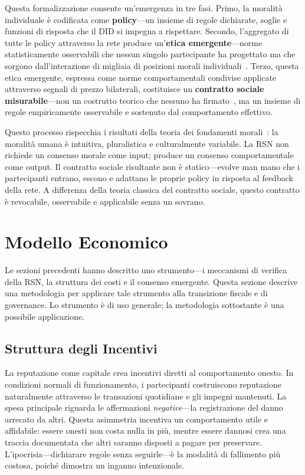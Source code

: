 \documentclass[11pt,a4paper,twocolumn]{article}
\begin{document}
Questa formalizzazione consente un'emergenza in tre fasi. Primo, la moralità individuale è codificata come \textbf{policy}---un insieme di regole dichiarate, soglie e funzioni di risposta che il DID si impegna a rispettare. Secondo, l'aggregato di tutte le policy attraverso la rete produce un'\textbf{etica emergente}---norme statisticamente osservabili che nessun singolo partecipante ha progettato ma che sorgono dall'interazione di migliaia di posizioni morali individuali~\cite{durkheim1893}. Terzo, questa etica emergente, espressa come norme comportamentali condivise applicate attraverso segnali di prezzo bilaterali, costituisce un \textbf{contratto sociale misurabile}---non un costrutto teorico che nessuno ha firmato~\cite{rawls1971}, ma un insieme di regole empiricamente osservabile e sostenuto dal comportamento effettivo.

Questo processo rispecchia i risultati della teoria dei fondamenti morali~\cite{haidt2012}: la moralità umana è intuitiva, pluralistica e culturalmente variabile. La RSN non richiede un consenso morale come input; produce un consenso comportamentale come output. Il contratto sociale risultante non è statico---evolve man mano che i partecipanti entrano, escono e adattano le proprie policy in risposta al feedback della rete. A differenza della teoria classica del contratto sociale, questo contratto è revocabile, osservabile e applicabile senza un sovrano.

\section{Modello Economico}

Le sezioni precedenti hanno descritto uno strumento---i meccanismi di verifica della RSN, la struttura dei costi e il consenso emergente. Questa sezione descrive una metodologia per applicare tale strumento alla transizione fiscale e di governance. Lo strumento è di uso generale; la metodologia sottostante è una possibile applicazione.

\subsection{Struttura degli Incentivi}

La reputazione come capitale crea incentivi diretti al comportamento onesto. In condizioni normali di funzionamento, i partecipanti costruiscono reputazione naturalmente attraverso le transazioni quotidiane e gli impegni mantenuti. La spesa principale riguarda le affermazioni \emph{negative}---la registrazione del danno arrecato da altri. Questa asimmetria incentiva un comportamento utile e affidabile: essere onesti non costa nulla in più, mentre essere dannosi crea una traccia documentata che altri saranno disposti a pagare per preservare. L'ipocrisia---dichiarare regole senza seguirle---è la modalità di fallimento più costosa, poiché dimostra un inganno intenzionale.
\end{document}
